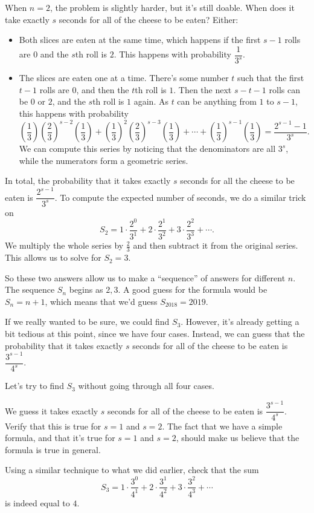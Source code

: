\documentclass[11pt,paper=letter]{scrartcl}
\begin{document}
When $n = 2$, the problem is slightly harder, but it's still doable. When does it take exactly $s$ seconds for all of the cheese to be eaten? Either:
\begin{itemize}
  \item Both slices are eaten at the same time, which happens if the first $s-1$ rolls are $0$ and the $s$th roll is $2$. This happens with probability $\dfrac{1}{3^s}$.
  \item The slices are eaten one at a time. There's some number $t$ such that the first $t-1$ rolls are $0$, and then the $t$th roll is $1$. Then the next $s-t-1$ rolls can be $0$ or $2$, and the $s$th roll is $1$ again. As $t$ can be anything from $1$ to $s-1$, this happens with probability
  \[
  \left(\frac{1}{3}\right)\left(\frac{2}{3}\right)^{s-2}\left(\frac{1}{3}\right)
  + \left(\frac{1}{3}\right)^2\left(\frac{2}{3}\right)^{s-3}\left(\frac{1}{3}\right) + \cdots
  + \left(\frac{1}{3}\right)^{s-1}\left(\frac{1}{3}\right) = \frac{2^{s-1} - 1}{3^s}.
  \]
  We can compute this series by noticing that the denominators are all $3^s$, while the numerators form a geometric series.
\end{itemize}
In total, the probability that it takes exactly $s$ seconds for all the cheese to be eaten is $\dfrac{2^{s-1}}{3^s}$. To compute the expected number of seconds, we do a similar trick on
\[
  S_2 = 1\cdot\frac{2^0}{3^1} + 2\cdot\frac{2^1}{3^2} + 3\cdot\frac{2^2}{3^3} + \cdots.
\]
We multiply the whole series by $\frac{2}{3}$ and then subtract it from the original series. This allows us to solve for $S_2 = 3$.

So these two answers allow us to make a ``sequence'' of answers for different $n$. The sequence $S_n$ begins as $2, 3$. A good guess for the formula would be $S_n = n+1$, which means that we'd guess $S_{2018} = 2019$.

If we really wanted to be sure, we could find $S_3$. However, it's already getting a bit tedious at this point, since we have four cases. Instead, we can guess that the probability that it takes exactly $s$ seconds for all of the cheese to be eaten is $\dfrac{3^{s-1}}{4^s}$.

\begin{exrboxed}
  Let's try to find $S_3$ without going through all four cases.
  \begin{enumthin}[label=(\alph*)]
    \item We guess it takes exactly $s$ seconds for all of the cheese to be eaten is $\dfrac{3^{s-1}}{4^s}$. Verify that this is true for $s = 1$ and $s = 2$. The fact that we have a simple formula, and that it's true for $s = 1$ and $s = 2$, should make us believe that the formula is true in general.
    \item Using a similar technique to what we did earlier, check that the sum
    \[
    S_3 = 1\cdot\frac{3^0}{4^1} + 2\cdot\frac{3^1}{4^2} + 3\cdot\frac{3^2}{4^3} + \cdots
    \]
    is indeed equal to $4$.
  \end{enumthin}
\end{exrboxed}
\end{document}
